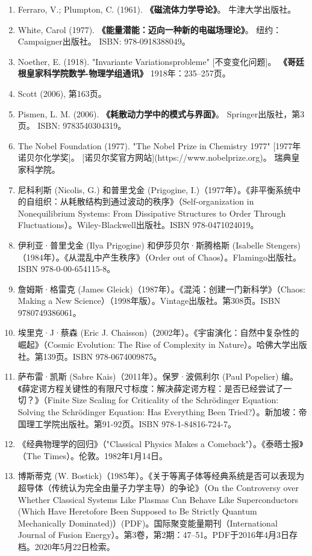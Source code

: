 \begin{enumerate}
\item Ferraro, V.; Plumpton, C. (1961).  
  \textbf{《磁流体力学导论》}。  
  牛津大学出版社。  
\item White, Carol (1977).  
  \textbf{《能量潜能：迈向一种新的电磁场理论》}。  
  纽约：Campaigner出版社。  
  ISBN: 978-0918388049。  
\item Noether, E. (1918). 
  "Invariante Variationsprobleme" [不变变化问题]。  
  \textbf{《哥廷根皇家科学院数学-物理学组通讯》} 1918年：235–257页。  
\item Scott (2006), 第163页。 
\item Pismen, L. M. (2006). 
  \textbf{《耗散动力学中的模式与界面》}。  
  Springer出版社，第3页。  
  ISBN: 9783540304319。  
\item The Nobel Foundation (1977).  
  "The Nobel Prize in Chemistry 1977" [1977年诺贝尔化学奖]。  
  [诺贝尔奖官方网站](https://www.nobelprize.org)。  
  瑞典皇家科学院。
\item 尼科利斯 (Nicolis, G.) 和普里戈金 (Prigogine, I.)（1977年）。《非平衡系统中的自组织：从耗散结构到通过波动的秩序》（Self-organization in Nonequilibrium Systems: From Dissipative Structures to Order Through Fluctuations）。Wiley-Blackwell出版社。ISBN 978-0471024019。
\item 伊利亚·普里戈金 (Ilya Prigogine) 和伊莎贝尔·斯腾格斯 (Isabelle Stengers)（1984年）。《从混乱中产生秩序》（Order out of Chaos）。Flamingo出版社。ISBN 978-0-00-654115-8。
\item 詹姆斯·格雷克 (James Gleick)（1987年）。《混沌：创建一门新科学》（Chaos: Making a New Science）（1998年版）。Vintage出版社。第308页。ISBN 9780749386061。
\item 埃里克·J·蔡森 (Eric J. Chaisson)（2002年）。《宇宙演化：自然中复杂性的崛起》（Cosmic Evolution: The Rise of Complexity in Nature）。哈佛大学出版社。第139页。ISBN 978-0674009875。
\item 萨布雷·凯斯 (Sabre Kais)（2011年）。保罗·波佩利尔 (Paul Popelier) 编。《薛定谔方程关键性的有限尺寸标度：解决薛定谔方程：是否已经尝试了一切？》（Finite Size Scaling for Criticality of the Schrödinger Equation: Solving the Schrödinger Equation: Has Everything Been Tried?）。新加坡：帝国理工学院出版社。第91-92页。ISBN 978-1-84816-724-7。
\item 《经典物理学的回归》（"Classical Physics Makes a Comeback"）。《泰晤士报》（The Times）。伦敦。1982年1月14日。
\item 博斯蒂克 (W. Bostick)（1985年）。《关于等离子体等经典系统是否可以表现为超导体（传统认为完全由量子力学主导）的争论》（On the Controversy over Whether Classical Systems Like Plasmas Can Behave Like Superconductors (Which Have Heretofore Been Supposed to Be Strictly Quantum Mechanically Dominated)）(PDF)。国际聚变能量期刊（International Journal of Fusion Energy）。第3卷，第2期：47–51。PDF于2016年4月3日存档。2020年5月22日检索。

\end{enumerate}
